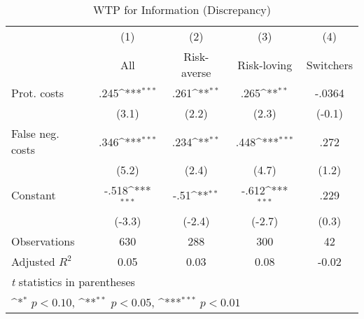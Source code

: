 \begin{table}[htbp]\centering
\def\sym#1{\ifmmode^{#1}\else\(^{#1}\)\fi}
\caption{WTP for Information (Discrepancy)}
\begin{tabular}{l*{4}{c}}
\hline\hline
                &\multicolumn{1}{c}{(1)}&\multicolumn{1}{c}{(2)}&\multicolumn{1}{c}{(3)}&\multicolumn{1}{c}{(4)}\\
                &\multicolumn{1}{c}{All}&\multicolumn{1}{c}{Risk-averse}&\multicolumn{1}{c}{Risk-loving}&\multicolumn{1}{c}{Switchers}\\
\hline
Prot. costs     &     .245\sym{***}&     .261\sym{**} &     .265\sym{**} &   -.0364         \\
                &    (3.1)         &    (2.2)         &    (2.3)         &   (-0.1)         \\
False neg. costs&     .346\sym{***}&     .234\sym{**} &     .448\sym{***}&     .272         \\
                &    (5.2)         &    (2.4)         &    (4.7)         &    (1.2)         \\
Constant        &    -.518\sym{***}&     -.51\sym{**} &    -.612\sym{***}&     .229         \\
                &   (-3.3)         &   (-2.4)         &   (-2.7)         &    (0.3)         \\
\hline
Observations    &      630         &      288         &      300         &       42         \\
Adjusted \(R^{2}\)&     0.05         &     0.03         &     0.08         &    -0.02         \\
\hline\hline
\multicolumn{5}{l}{\footnotesize \textit{t} statistics in parentheses}\\
\multicolumn{5}{l}{\footnotesize \sym{*} \(p<0.10\), \sym{**} \(p<0.05\), \sym{***} \(p<0.01\)}\\
\end{tabular}
\end{table}
